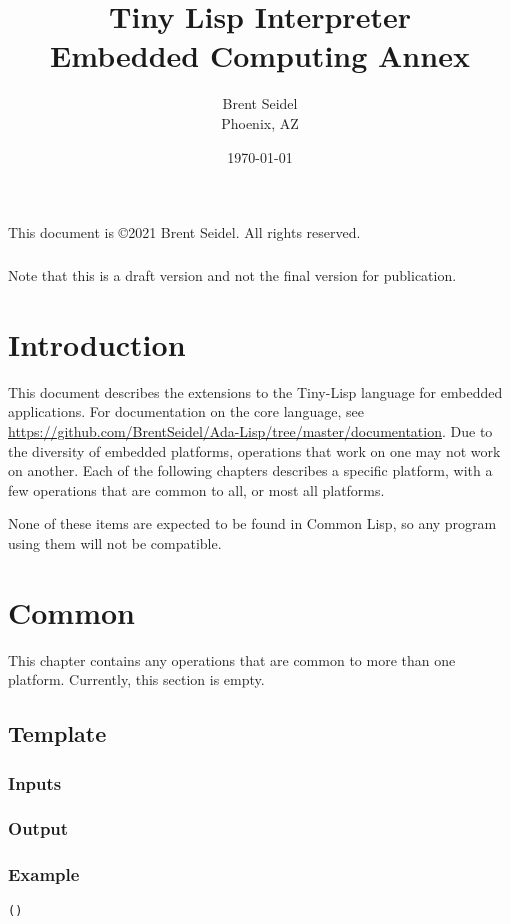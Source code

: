 \documentclass[10pt, openany]{book}
\title{Tiny Lisp Interpreter\\Embedded Computing Annex}
\author{Brent Seidel \\ Phoenix, AZ}
\date{ \today }
\newcommand{\tl}{Tiny-Lisp}
\newcommand{\cl}{Common Lisp}
\begin{document}
%
%
\frontmatter
\maketitle
\begin{center}
This document is \copyright 2021 Brent Seidel.  All rights reserved.

\paragraph{}Note that this is a draft version and not the final version for publication.
\end{center}
\tableofcontents

\mainmatter
\chapter{Introduction}
This document describes the extensions to the \tl{} language for embedded applications.  For documentation on the core language, see \url{https://github.com/BrentSeidel/Ada-Lisp/tree/master/documentation}.  Due to the diversity of embedded platforms, operations that work on one may not work on another.  Each of the following chapters describes a specific platform, with a few operations that are common to all, or most all platforms.

None of these items are expected to be found in \cl, so any program using them will not be compatible.

\chapter{Common}
\lstset{language=[Tiny]Lisp}
This chapter contains any operations that are common to more than one platform.  Currently, this section is empty.
\section{Template}
\subsection{Inputs}
\subsection{Output}
\subsection{Example}
\begin{lstlisting}
()
\end{lstlisting}
\end{document}
